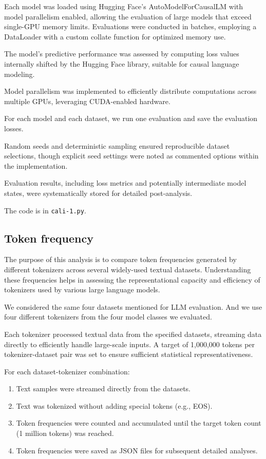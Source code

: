 \documentclass{article}
\begin{document}
Each model was loaded using Hugging Face’s AutoModelForCausalLM with model parallelism enabled, allowing the evaluation of large models that exceed single-GPU memory limits. Evaluations were conducted in batches, employing a DataLoader with a custom collate function for optimized memory use.

The model’s predictive performance was assessed by computing loss values internally shifted by the Hugging Face library, suitable for causal language modeling. 

Model parallelism was implemented to efficiently distribute computations across multiple GPUs, leveraging CUDA-enabled hardware.

For each model and each dataset, we run one evaluation and save the evaluation losses.

Random seeds and deterministic sampling ensured reproducible dataset selections, though explicit seed settings were noted as commented options within the implementation.

Evaluation results, including loss metrics and potentially intermediate model states, were systematically stored for detailed post-analysis.

The code is in \texttt{cali-1.py}.

\subsection{Token frequency}\label{app:token}
The purpose of this analysis is to compare token frequencies generated by different tokenizers across several widely-used textual datasets. Understanding these frequencies helps in assessing the representational capacity and efficiency of tokenizers used by various large language models.


We considered the same four datasets mentioned for LLM evaluation. And we use four different tokenizers from the four model classes we evaluated.

Each tokenizer processed textual data from the specified datasets, streaming data directly to efficiently handle large-scale inputs. A target of 1,000,000 tokens per tokenizer-dataset pair was set to ensure sufficient statistical representativeness.

For each dataset-tokenizer combination:
\begin{enumerate}
    \item Text samples were streamed directly from the datasets.
    \item Text was tokenized without adding special tokens (e.g., EOS).
    \item Token frequencies were counted and accumulated until the target token count (1 million tokens) was reached.
    \item Token frequencies were saved as JSON files for subsequent detailed analyses.
\end{enumerate}
\end{document}

